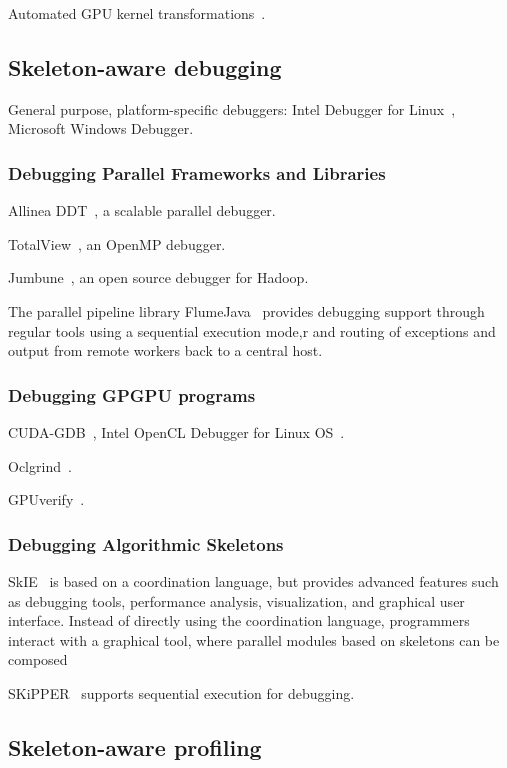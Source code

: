Automated GPU kernel transformations~\cite{Wahib2015a}.


\subsection{Skeleton-aware debugging}

General purpose, platform-specific debuggers: Intel Debugger for
Linux~\cite{Blair-chappell}, Microsoft Windows Debugger.


\subsubsection{Debugging Parallel Frameworks and Libraries}

Allinea DDT~\cite{K2010}, a scalable parallel debugger.

TotalView~\cite{Cownie2000}, an OpenMP debugger.

Jumbune~\cite{ImpetusTechnologies}, an open source debugger for
Hadoop.

The parallel pipeline library FlumeJava~\cite{Chambers2010} provides
debugging support through regular tools using a sequential execution
mode,r and routing of exceptions and output from remote workers back to
a central host.


\subsubsection{Debugging GPGPU programs}

CUDA-GDB~\cite{NVIDIA2016}, Intel OpenCL Debugger for Linux
OS~\cite{IntelCorporation2016}.

Oclgrind~\cite{Price2015}.

GPUverify~\cite{Betts2012}.


\subsubsection{Debugging Algorithmic Skeletons}

SkIE~\cite{Bacci1999} is based on a coordination language, but
provides advanced features such as debugging tools, performance
analysis, visualization, and graphical user interface. Instead of
directly using the coordination language, programmers interact with a
graphical tool, where parallel modules based on skeletons can be
composed

SKiPPER~\cite{Cezeaux1999} supports sequential execution for
debugging.


\subsection{Skeleton-aware profiling}

